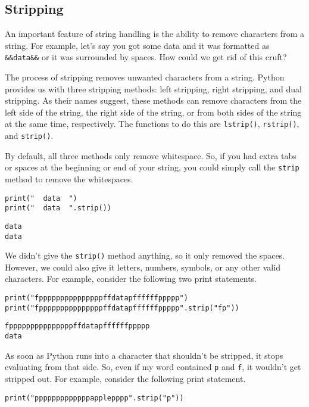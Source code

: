 \subsection{Stripping}
An important feature of string handling is the ability to remove characters from a string. For example, let's say you got some data and it was formatted as \verb|&&data&&| or it was surrounded by spaces. How could we get rid of this cruft?\par
The process of stripping removes unwanted characters from a string. Python provides us with three stripping methods: left stripping, right stripping, and dual stripping. As their names suggest, these methods can remove characters from the left side of the string, the right side of the string, or from both sides of the string at the same time, respectively. The functions to do this are \verb|lstrip()|, \verb|rstrip()|, and \verb|strip()|.\par
By default, all three methods only remove whitespace. So, if you had extra tabs or spaces at the beginning or end of your string, you could simply call the \verb|strip| method to remove the whitespaces.\par
\begin{lstlisting}[style=pippython]
print("  data  ")
print("  data  ".strip())
\end{lstlisting}
\begin{lstlisting}[style=none]
  data  
data
\end{lstlisting}
We didn't give the \verb|strip()| method anything, so it only removed the spaces. However, we could also give it letters, numbers, symbols, or any other valid characters. For example, consider the following two print statements.\par
\begin{lstlisting}[style=pippython]
print("fpppppppppppppppffdatapffffffppppp")
print("fpppppppppppppppffdatapffffffppppp".strip("fp"))
\end{lstlisting}
\begin{lstlisting}[style=none]
fpppppppppppppppffdatapffffffppppp
data
\end{lstlisting}
As soon as Python runs into a character that shouldn't be stripped, it stops evaluating from that side. So, even if my word contained \verb|p| and \verb|f|, it wouldn't get stripped out. For example, consider the following print statement.\par
\begin{lstlisting}[style=pippython]
print("pppppppppppppapplepppp".strip("p"))
\end{lstlisting}
